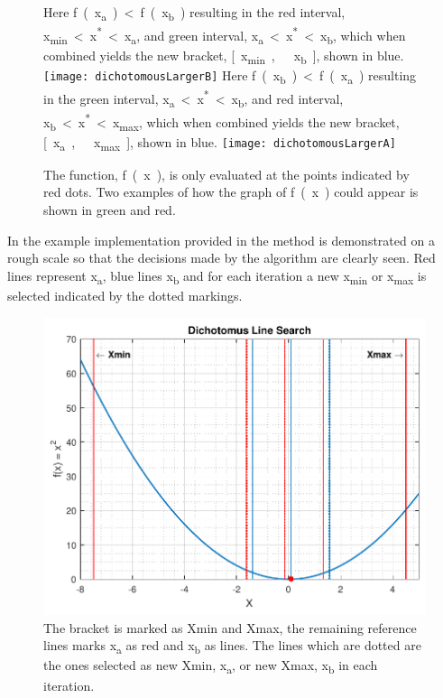   \begin{figure}[H]
    \begin{minipage}{\linewidth}
      \captionsetup[subfigure]{font = footnotesize}
      \centering
      \subcaptionbox
      {
        Here \si{f(x_a) < f(x_b)} resulting in the red interval, \si{x_{min} < x^* < x_a}, and green interval, \si{x_a < x^* < x_b}, which when combined yields the new bracket, \si{[x_{min},\ x_b]}, shown in blue.
        \label{dichotomousLargerB}
      }
      {
        \texttt{[image: dichotomousLargerB]}
      }\quad
      \subcaptionbox
      {
        Here \si{f(x_b) < f(x_a)} resulting in the green interval, \si{x_a < x^* < x_b}, and red interval, \si{x_b < x^* < x_{max}}, which when combined yields the new bracket, \si{[x_a,\ x_{max}]}, shown in blue.
        \label{dichotomousLargerA}
      }
      {
        \texttt{[image: dichotomousLargerA]}
      }
      \caption{The function, \si{f(x)}, is only evaluated at the points indicated by red dots. Two examples of how the graph of \si{f(x)} could appear is shown in green and red.}
      \label{dichotomousLargerAorB}
    \end{minipage}
  \end{figure}

In the example implementation provided in  the method is demonstrated on a rough scale so that the decisions made by the algorithm are clearly seen. Red lines represent \si{x_a}, blue lines \si{x_b} and for each iteration a new \si{x_{min}} or \si{x_{max}} is selected indicated by the dotted markings.
%
\begin{figure}[H]
	\centering
	\includegraphics[width=.5\textwidth]{figures/dichotomousLineSearchComprehension.pdf}
	\caption{The bracket is marked as Xmin and Xmax, the remaining reference lines marks \si{x_a} as red and \si{x_b} as lines. The lines which are dotted are the ones selected as new Xmin, \si{x_a}, or new Xmax, \si{x_b} in each iteration.}
	\label{dichotomousLineSearchComprehensive}
\end{figure}